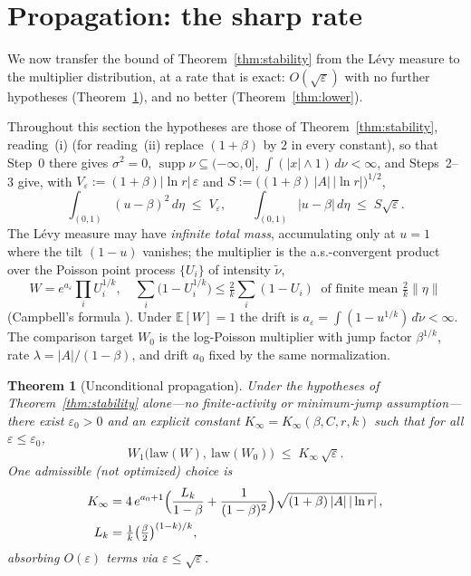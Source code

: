 \documentclass[12pt]{amsart}
\newtheorem{theorem}{Theorem}
\theoremstyle{definition}
\theoremstyle{remark}
\DeclareMathOperator{\supp}{supp}
\begin{document}
\section{Propagation: the sharp rate}
\label{sec:propagation}

We now transfer the bound of Theorem~\ref{thm:stability} from the
L\'evy measure to the multiplier distribution, at a rate that is
exact: $O(\sqrt\varepsilon)$ with no further hypotheses
(Theorem~\ref{thm:propagation}), and no better
(Theorem~\ref{thm:lower}).

Throughout this section the hypotheses are those of
Theorem~\ref{thm:stability}, reading~(i) (for reading~(ii) replace
$(1+\beta)$ by $2$ in every constant), so that Step~0 there gives
$\sigma^2 = 0$, $\supp\nu \subseteq (-\infty,0]$,
$\int(|x|\wedge1)\,d\nu < \infty$, and Steps~2--3 give, with
$V_\varepsilon := (1+\beta)|\ln r|\,\varepsilon$ and
$S := \bigl((1+\beta)\,|A|\,|\ln r|\bigr)^{1/2}$,
\begin{equation}\label{eq:VF}
  \int_{(0,1)}(u-\beta)^2\,d\eta \;\le\; V_\varepsilon,
  \qquad
  \int_{(0,1)}|u-\beta|\,d\eta \;\le\; S\sqrt{\varepsilon} .
\end{equation}
The L\'evy measure may have \emph{infinite total mass},
accumulating only at $u = 1$ where the tilt $(1-u)$ vanishes; the
multiplier is the a.s.-convergent product over the Poisson point
process $\{U_i\}$ of intensity $\tilde\nu$,
\[
  W = e^{a_\varepsilon}\prod_i U_i^{1/k},
  \quad
  \sum_i\bigl(1 - U_i^{1/k}\bigr) \le \tfrac2k\sum_i(1-U_i)
  \ \text{ of finite mean } \tfrac2k\|\eta\|
\]
(Campbell's formula \cite{Kin93}).  Under $\mathbb{E}[W]=1$ the
drift is $a_\varepsilon = \int(1-u^{1/k})\,d\tilde\nu < \infty$.
The comparison target $W_0$ is the log-Poisson multiplier with jump
factor $\beta^{1/k}$, rate $\lambda = |A|/(1-\beta)$, and drift
$a_0$ fixed by the same normalization.

\begin{theorem}[Unconditional propagation]\label{thm:propagation}
Under the hypotheses of Theorem~\textup{\ref{thm:stability}}
alone---no finite-activity or minimum-jump assumption---there exist
$\varepsilon_0 > 0$ and an explicit constant $K_\infty =
K_\infty(\beta, C, r, k)$ such that for all $\varepsilon \le
\varepsilon_0$,
\[
  W_1\bigl(\mathrm{law}(W),\ \mathrm{law}(W_0)\bigr)
  \;\le\; K_\infty\,\sqrt{\varepsilon}.
\]
One admissible (not optimized) choice is
\[
\begin{aligned}
  K_\infty &= 4\,e^{a_0+1}\Bigl(\frac{L_k}{1-\beta}
  + \frac{1}{(1-\beta)^2}\Bigr)
  \sqrt{(1+\beta)\,|A|\,|\ln r|}\,,\\
  L_k &= \tfrac1k\bigl(\tfrac\beta2\bigr)^{(1-k)/k},
\end{aligned}
\]
absorbing $O(\varepsilon)$ terms via $\varepsilon \le
\sqrt\varepsilon$.
\end{theorem}
\end{document}
